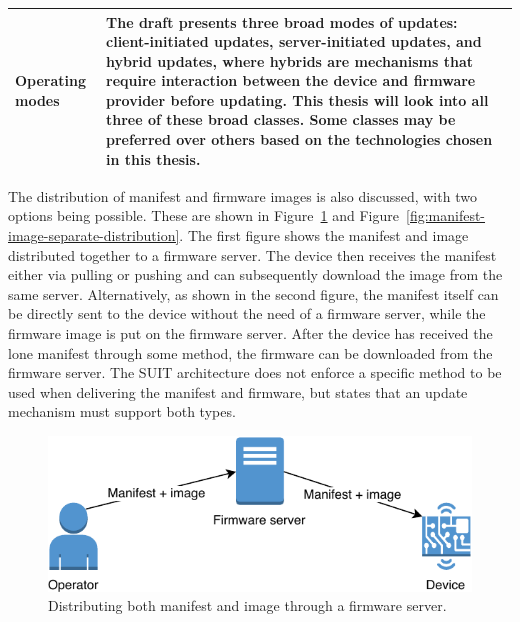 \documentclass[0-thesis.tex]{subfiles}
\begin{document}
\begin{small}
\begin{longtable}[]{@{}ll@{}}
\begin{minipage}[t]{0.41\columnwidth}
        Operating modes\strut
        \end{minipage} & \begin{minipage}[t]{0.53\columnwidth}\raggedright\strut
        The draft presents three broad modes of updates: client-initiated
        updates, server-initiated updates, and hybrid updates, where hybrids are
        mechanisms that require interaction between the device and firmware
        provider before updating. This thesis will look into all three of these
        broad classes. Some classes may be preferred over others based on the
        technologies chosen in this thesis.\strut
        \end{minipage}\tabularnewline
        \bottomrule
\end{longtable}
\end{small}
        

The distribution of manifest and firmware images is also discussed, with two options being
possible. These are shown in Figure~\ref{fig:manifest-image-combined-distribution} and
Figure~\ref{fig:manifest-image-separate-distribution}. The first figure shows the manifest
and image distributed together to a firmware server. The device then receives the manifest
either via pulling or pushing and can subsequently download the image from the same
server. Alternatively, as shown in the second figure, the manifest itself can be directly
sent to the device without the need of a firmware server, while the firmware image is put
on the firmware server. After the device has received the lone manifest through some
method, the firmware can be downloaded from the firmware server. The SUIT architecture
does not enforce a specific method to be used when delivering the manifest and firmware,
but states that an update mechanism must support both types.

\begin{figure}[h]
    \caption{Distributing both manifest and image through a firmware server.}   
    \label{fig:manifest-image-combined-distribution}
    \includegraphics{images/together.pdf}
\end{figure}
\end{document}
